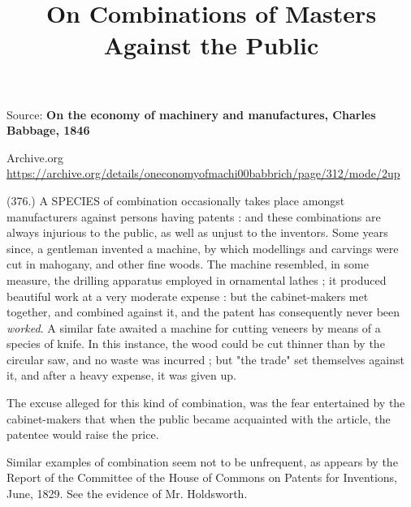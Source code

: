 \documentclass{article}
\begin{document}
\title{On Combinations of Masters Against the Public}

\maketitle


Source: \textbf{On the economy of machinery and manufactures, Charles Babbage, 1846}


Archive.org \href{https://archive.org/details/oneconomyofmachi00babbrich/page/312/mode/2up}{https://archive.org/details/oneconomyofmachi00babbrich/page/312/mode/2up} 


(376.) A SPECIES of combination occasionally takes place amongst manufacturers against persons having patents : and these combinations are always injurious to the public, as well as unjust to the inventors. Some years since, a gentleman invented a machine, by which modellings and carvings were cut in mahogany, and other fine woods. The machine resembled, in some measure, the drilling apparatus employed in ornamental lathes ; it produced beautiful work at a very moderate expense : but the cabinet-makers met together, and combined against it, and the patent has consequently never been \emph{worked}. A similar fate awaited a machine for cutting veneers by means of a species of knife. In this instance, the wood could be cut thinner than by the circular saw, and no waste was incurred ; but "the trade" set themselves against it, and after a heavy expense, it was given up.


The excuse alleged for this kind of combination, was the fear entertained by the cabinet-makers that when the public became acquainted with the article, the patentee would raise the price.


Similar examples of combination seem not to be unfrequent, as appears by the Report of the Committee of the House of Commons on Patents for Inventions, June, 1829. See the evidence of Mr. Holdsworth.
\end{document}

